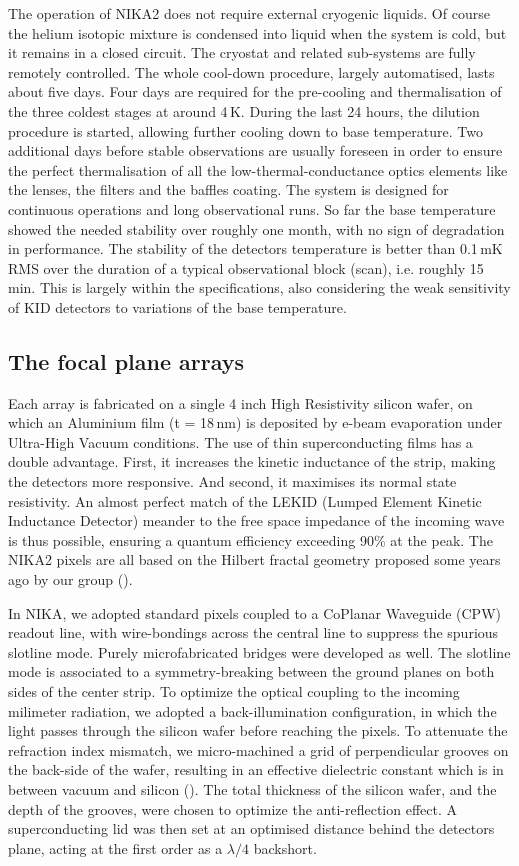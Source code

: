 \documentclass[]{aa} %
\begin{document}
The operation of NIKA2 does not require external cryogenic liquids. Of course the helium isotopic mixture is condensed into liquid when the system is cold, but it remains in a closed circuit. The cryostat and related sub-systems are fully remotely controlled. The whole cool-down procedure, largely automatised, lasts about five days. Four days are required for the pre-cooling and thermalisation of the three coldest stages at around 4\,K. During the last 24 hours, the dilution procedure is started, allowing further cooling down to base temperature. Two additional days before stable observations are usually foreseen in order to ensure the perfect thermalisation of all the low-thermal-conductance optics elements like the lenses, the filters and the baffles coating. The system is designed for continuous operations and long observational runs. So far the base temperature showed the needed stability over roughly one month, with no sign of degradation in performance. The stability of the detectors temperature is better than 0.1\,mK RMS over the duration of a typical observational block (scan), i.e. roughly 15\,min. This is largely within the specifications, also considering the weak sensitivity of KID detectors to variations of the base temperature. 


 \subsection{The focal plane arrays}

Each array is fabricated on a single 4 inch High Resistivity silicon wafer, on which an Aluminium film (t = 18\,nm) is deposited by e-beam evaporation under Ultra-High Vacuum conditions. The use of thin superconducting films has a double advantage. First, it increases the kinetic inductance of the strip, making the detectors more responsive. And second, it maximises its normal state resistivity. An almost perfect match of the LEKID (Lumped Element Kinetic Inductance Detector) meander to the free space impedance of the incoming wave is thus possible, ensuring a quantum efficiency exceeding 90\% at the peak. The NIKA2 pixels are all based on the Hilbert fractal geometry proposed some years ago by our group (\cite{Roesch2012}). 

In NIKA, we adopted standard pixels coupled to a CoPlanar Waveguide (CPW) readout line, with wire-bondings across the central line to suppress the spurious slotline mode. Purely microfabricated bridges were developed as well. The slotline mode is associated to a symmetry-breaking between the ground planes on both sides of the center strip. To optimize the optical coupling to the incoming milimeter radiation, we adopted a back-illumination configuration, in which the light passes through the silicon wafer before reaching the pixels. To attenuate the refraction index mismatch, we micro-machined a grid of perpendicular grooves on the back-side of the wafer, resulting in an effective dielectric constant which is in between vacuum and silicon (\cite{Goupy2016}). The total thickness of the silicon wafer, and the depth of the grooves, were chosen to optimize the anti-reflection effect. A superconducting lid was then set at an optimised distance behind the detectors plane, acting at the first order as a $\lambda/4$ backshort. 
\end{document}
